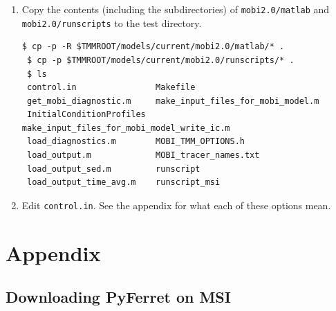 \documentclass[a4paper]{article}
\begin{document}
\begin{enumerate}
\item Copy the contents (including the subdirectories) of \verb|mobi2.0/matlab| and  \verb|mobi2.0/runscripts| to the test directory.
\begin{lstlisting}[style=DOS]
 $ cp -p -R $TMMROOT/models/current/mobi2.0/matlab/* .
 $ cp -p $TMMROOT/models/current/mobi2.0/runscripts/* .
 $ ls
 control.in                Makefile
 get_mobi_diagnostic.m     make_input_files_for_mobi_model.m
 InitialConditionProfiles  make_input_files_for_mobi_model_write_ic.m
 load_diagnostics.m        MOBI_TMM_OPTIONS.h
 load_output.m             MOBI_tracer_names.txt
 load_output_sed.m         runscript
 load_output_time_avg.m    runscript_msi
\end{lstlisting}

\item Edit \verb|control.in|. See the appendix for what each of these options mean.

\end{enumerate}


\section{Appendix}

\subsection{Downloading PyFerret on MSI}
\end{document}
